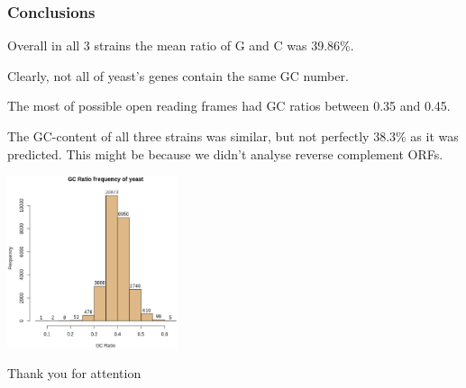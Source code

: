 \documentclass{beamer}
\begin{document}
\begin{frame}
\frametitle{Conclusions}

Overall in all 3 strains the mean ratio of G and C was 39.86\%.

Clearly, not all of yeast's genes contain the same GC number.

The most of possible open reading frames had GC ratios between 0.35 and 0.45. 

The GC-content of all three strains was similar, but not perfectly 38.3\% as it was predicted. This might be because we didn't analyse reverse complement ORFs.

\begin{minipage}{0.4\textwidth}
\includegraphics[width=50mm]{images/AllGenomes.eps}
\end{minipage}
\end{frame}


\begin{frame}
\Huge{\centerline{Thank you for attention}}
\end{frame}

\end{document}
